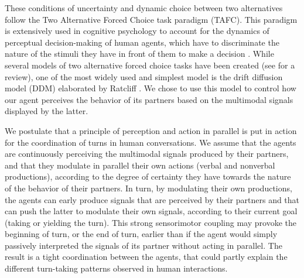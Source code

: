 These conditions of uncertainty and dynamic choice between two alternatives follow the Two Alternative Forced Choice task paradigm (TAFC). This paradigm is extensively used in cognitive psychology to account for
the dynamics of perceptual decision-making of human agents, which have to discriminate the nature of the
stimuli they have in front of them to make a decision \citep{bogacz_physics_2006}. While several models of two alternative forced choice tasks have been created (see \citep{bogacz_physics_2006} for a review), one of the most widely used and simplest model is the drift diffusion model (DDM) elaborated by Ratcliff \citep{ratcliff_theory_1978}. 
We chose to use this model to control how our agent perceives the behavior of its partners based on the multimodal signals displayed by the latter. 

 We postulate that a principle of perception and action in parallel is put in action for the coordination
of turns in human conversations. We assume that the agents are continuously perceiving the multimodal signals
produced by their partners, and that they modulate in parallel their own actions (verbal and nonverbal
productions), according to the degree of certainty they have towards the nature of the behavior of their partners.
In turn, by modulating their own productions, the agents can early produce signals that are perceived by
their partners and that can push the latter to modulate their own signals, according to their current goal
(taking or yielding the turn). This strong sensorimotor coupling may provoke the beginning of turn, or the end
of turn, earlier than if the agent would simply passively interpreted the signals of its partner without acting in
parallel. 
The result is a tight coordination between the agents, that could partly explain the different turn-taking patterns observed in human interactions. 
